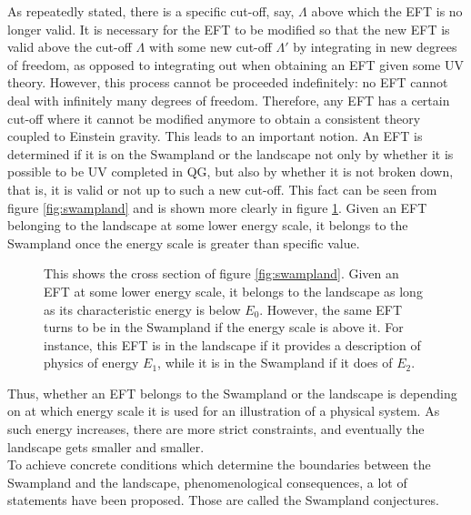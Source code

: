 \indent As repeatedly stated, there is a specific cut-off, say, $\Lambda$ above which the EFT is no longer valid. It is necessary for the EFT to be modified so that the new EFT is valid above the cut-off $\Lambda$ with some new cut-off $\Lambda'$ by integrating in new degrees of freedom, as opposed to integrating out when obtaining an EFT given some UV theory. However, this process cannot be proceeded indefinitely: no EFT cannot deal with infinitely many degrees of freedom. Therefore, any EFT has a certain cut-off where it cannot be modified anymore to obtain a consistent theory coupled to Einstein gravity. This leads to an important notion. An EFT is determined if it is on the Swampland or the landscape not only by whether it is possible to be UV completed in QG, but also by whether it is not broken down, that is, it is valid or not up to such a new cut-off. This fact can be seen from figure \ref{fig:swampland} and is shown more clearly in figure \ref{fig:cross}. Given an EFT belonging to the landscape at some lower energy scale, it belongs to the Swampland once the energy scale is greater than specific value. 

\begin{figure}
    \centering
    \caption{This shows the cross section of figure \ref{fig:swampland}. Given an EFT at some lower energy scale, it belongs to the landscape as long as its characteristic energy is below $E_{0}$. However, the same EFT turns to be in the Swampland if the energy scale is above it. For instance, this EFT is in the landscape if it provides a description of physics of energy $E_{1}$, while it is in the Swampland if it does of $E_{2}$.}
    \label{fig:cross}
\end{figure}
Thus, whether an EFT belongs to the Swampland or the landscape is depending on at which energy scale it is used for an illustration of a physical system. As such energy increases, there are more strict constraints, and eventually the landscape gets smaller and smaller.\\
\indent To achieve concrete conditions which determine the boundaries between the Swampland and the landscape, phenomenological consequences, a lot of statements have been proposed. Those are called the Swampland conjectures.

